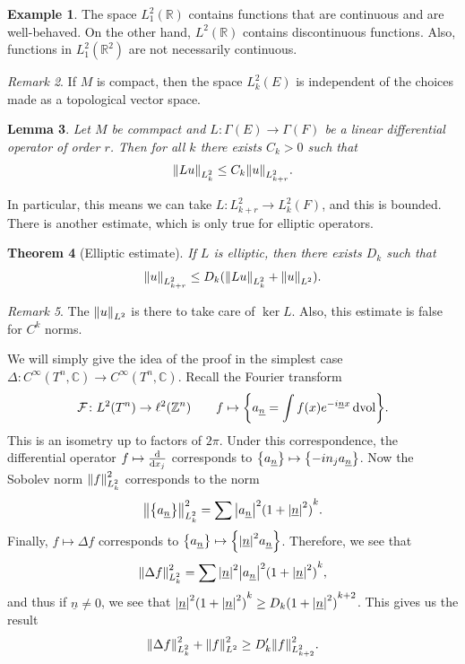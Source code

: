 \documentclass[leqno, openany]{memoir}
\newtheorem{thm}{Theorem}[section]
\newtheorem{lem}[thm]{Lemma}
\theoremstyle{definition}
\newtheorem{exm}[thm]{Example}
\theoremstyle{remark}
\newtheorem{rmk}[thm]{Remark}
\theoremstyle{plain}
\theoremstyle{definition}
\theoremstyle{remark}
\newcommand{\R}{\mathbb{R}}
\newcommand{\C}{\mathbb{C}}
\newcommand{\Z}{\mathbb{Z}}
\newcommand{\mc}[1]{\mathcal{#1}}
\newcommand{\mr}[1]{\mathrm{#1}}
\newcommand{\ul}[1]{\underline{#1}}
\begin{document}
\begin{exm} The space $L_1^2(\R)$ contains functions that are continuous and
are well-behaved. On the other hand, $L^2(\R)$ contains discontinuous
functions. Also, functions in $L_1^2(\R^2)$ are not necessarily continuous.
\end{exm}

\begin{rmk} If $M$ is compact, then the space $L_k^2(E)$ is independent of the
choices made as a topological vector space.  \end{rmk}

\begin{lem} Let $M$ be commpact and $L \colon \Gamma(E) \to \Gamma(F)$ be a
    linear differential operator of order $r$. Then for all $k$ there exists
    $C_k > 0$ such that \[ \norm{L u}_{L^2_k} \leq C_k \norm{u}_{L^2_{k+r}}. \]
\end{lem}

In particular, this means we can take $L \colon L_{k+r}^2 \to L_k^2(F)$, and
this is bounded. There is another estimate, which is only true for elliptic
operators.

\begin{thm}[Elliptic estimate] If $L$ is elliptic, then there exists $D_k$ such
    that \[ \norm{u}_{L^2_{k+r}} \leq D_k (\norm{Lu}_{L^2_k} + \norm{u}_{L^2}).
    \] \end{thm}

\begin{rmk} The $\norm{u}_{L^2}$ is there to take care of $\ker L$. Also, this
estimate is false for $C^k$ norms.  \end{rmk}

We will simply give the idea of the proof in the simplest case $\Delta \colon
C^{\infty}(T^n, \C) \to C^{\infty}(T^n, \C)$. Recall the Fourier transform \[
\mc{F} \colon L^2(T^n) \to \ell^2(\Z^n) \qquad f \mapsto \qty{a_{\ul{n}} = \int
f(x) e^{-i \ul{n} x} \dd{\mr{vol}}}. \] This is an isometry up to factors of $2
\pi$. Under this correspondence, the differential operator $f \mapsto \dv{x_j}$
corresponds to $\qty{a_{\ul{n}}} \mapsto \qty{-i n_j a_{\ul{n}}}$. Now the
Sobolev norm $\norm{f}_{L^2_k}^2$ corresponds to the norm \[
\norm{\qty{a_{\ul{n}}}}_{L^2_k}^2 = \sum \abs{a_{\ul{n}}}^2 {(1 +
\abs{\ul{n}}^2)}^k. \] Finally, $f \mapsto \Delta f$ corresponds to
$\qty{a_{\ul{n}}} \mapsto \qty{\abs{\ul{n}}^2 a_{\ul{n}}}$. Therefore, we see
that \[ \norm{\Delta f}_{L^2_k}^2 = \sum \abs{\ul{n}}^2 \abs{a_{\ul{n}}}^2 {(1
+ \abs{\ul{n}}^2)}^k, \] and thus if $\ul{n} \neq 0$, we see that
$\abs{\ul{n}}^2 {(1 + \abs{\ul{n}}^2)}^k \geq D_k {(1+\abs{\ul{n}}^2)}^{k+2}$.
This gives us the result \[ \norm{\Delta f}^2_{L^2_k} + \norm{f}_{L^2}^2 \geq
D_k' \norm{f}_{L^2_{k+2}}^2. \]
\end{document}
